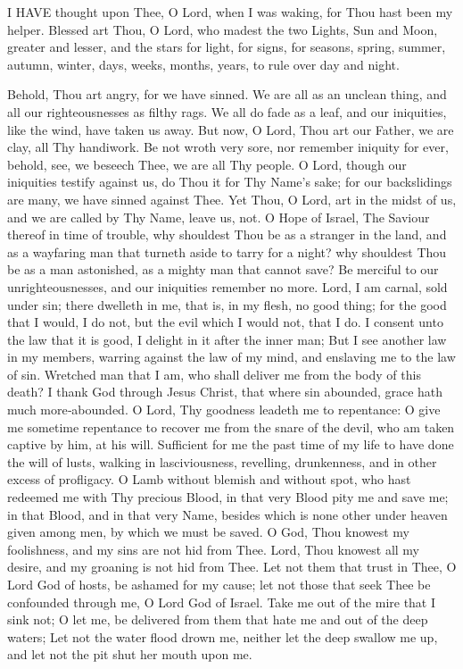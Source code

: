 

I HAVE thought upon Thee, O Lord, when I was waking, for Thou hast been my helper. Blessed art Thou, O Lord,  who madest the two Lights, Sun and Moon, greater and lesser, and the stars for light, for signs, for seasons, spring, summer, autumn, winter, days, weeks, months, years, to rule over day and night.


Behold, Thou art angry, for we have sinned. We are all as an unclean thing, and all our righteousnesses as filthy rags.  We all do fade as a leaf, and our iniquities, like the wind, have taken us away. But now, O Lord, Thou art our Father, we are clay, all Thy handiwork. Be not wroth very sore, nor remember iniquity for ever, behold, see, we beseech Thee, we are all Thy people. O Lord, though our iniquities testify against us, do Thou it for Thy Name’s sake; for our backslidings are many, we have sinned against Thee. Yet Thou, O Lord, art in the midst of us, and we are called by Thy Name, leave us, not. O Hope of Israel, The Saviour thereof in time of trouble, why shouldest Thou be as a stranger in the land, and as a wayfaring man that turneth aside to tarry for a night? why shouldest Thou be as a man astonished, as a mighty man that cannot save? Be merciful to our unrighteousnesses, and our iniquities remember no more. Lord, I am carnal, sold under sin; there dwelleth in me, that is, in my flesh, no good thing; for the good that I would, I do not, but the evil which I would not, that I do. I consent unto the law that it is good, I delight in it after the inner man; But I see another law in my members, warring against the law of my mind, and enslaving me to the law of sin. Wretched man that I am, who shall deliver me from the body of this death? I thank God through Jesus Christ, that where sin abounded, grace hath much more‑abounded. O Lord, Thy goodness leadeth me to repentance: O give me sometime repentance to recover me from the snare of the devil, who am taken captive by him, at his will. Sufficient for me the past time of my life to have done the will of lusts,  walking in lasciviousness, revelling, drunkenness, and in other excess of profligacy. O Lamb without blemish and without spot, who hast redeemed me with Thy precious Blood, in that very Blood pity me and save me; in that Blood, and in that very Name, besides which is none other under heaven given among men, by which we must be saved. O God, Thou knowest my foolishness, and my sins are not hid from Thee. Lord, Thou knowest all my desire, and my groaning is not hid from Thee. Let not them that trust in Thee, O Lord God of hosts, be ashamed for my cause; let not those that seek Thee be confounded through me, O Lord God of Israel. Take me out of the mire that I sink not; O let me, be delivered from them that hate me and out of the deep waters; Let not the water flood drown me, neither let the deep swallow me up, and let not the pit shut her mouth upon me.


